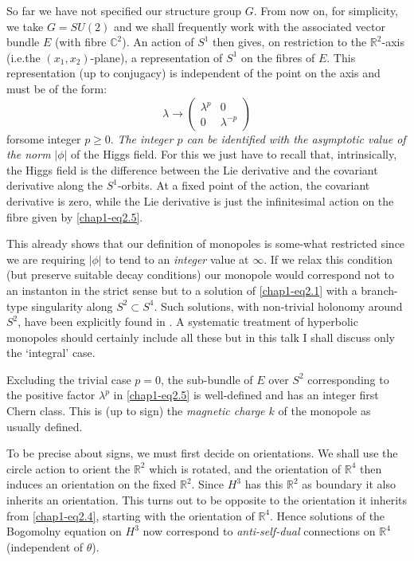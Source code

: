 So far we have not specified our structure group $G$. From now on, for
simplicity, we take $G=SU(2)$ and we shall frequently work with the
associated vector bundle $E$ (with fibre $\mathbb{C}^{2}$). An action
of $S^{1}$ then gives, on restriction to the $\mathbb{R}^{2}$-axis
(i.e.\@ the $(x_{1},x_{2})$-plane), a representation of $S^{1}$ on the
fibres of $E$. This representation (up to conjugacy) is independent of
the point on the axis and must be of the form:
\begin{equation}
\lambda\to 
\begin{pmatrix}
\lambda^{p} & 0\\
0 & \lambda^{-p}
\end{pmatrix}\label{chap1-eq2.5}
\end{equation}
for\pageoriginale some integer $p\geq 0$. {\em The integer $p$ can be identified
  with the asymptotic value of the norm} $|\phi|$ of the Higgs
field. For this we just have to recall that, intrinsically, the Higgs
field is the difference between the Lie derivative and the covariant
derivative along the $S^{1}$-orbits. At a fixed point of the action,
the covariant derivative is zero, while the Lie derivative is just the
infinitesimal action on the fibre given by \eqref{chap1-eq2.5}.

This already shows that our definition of monopoles is some-what
restricted since we are requiring $|\phi|$ to tend to an {\em integer}
value at $\infty$. If we relax this condition (but preserve suitable
decay conditions) our monopole would correspond not to an instanton in
the strict sense but to a solution of \eqref{chap1-eq2.1} with a
branch-type singularity along $S^{2}\subset S^{4}$. Such solutions,
with non-trivial holonomy around $S^{2}$, have been explicitly found
in \cite{chap1-key6}. A systematic treatment of hyperbolic monopoles
should certainly include all these but in this talk I shall discuss
only the `integral' case.

Excluding the trivial case $p=0$, the sub-bundle of $E$ over $S^{2}$
corresponding to the positive factor $\lambda^{p}$ in
\eqref{chap1-eq2.5} is well-defined and has an integer first Chern
class. This is (up to sign) the {\em magnetic charge $k$} of the
monopole as usually defined.

To be precise about signs, we must first decide on orientations. We
shall use the circle action to orient the $\mathbb{R}^{2}$ which is
rotated, and the orientation of $\mathbb{R}^{4}$ then induces an
orientation on the fixed $\mathbb{R}^{2}$. Since $H^{3}$ has this
$\mathbb{R}^{2}$ as boundary it also inherits an orientation. This
turns out to be opposite to the orientation it inherits from
\eqref{chap1-eq2.4}, starting with the orientation of
$\mathbb{R}^{4}$. Hence solutions of the Bogomolny equation on $H^{3}$
now correspond to {\em anti-self-dual} connections on $\mathbb{R}^{4}$
(independent of $\theta$).


